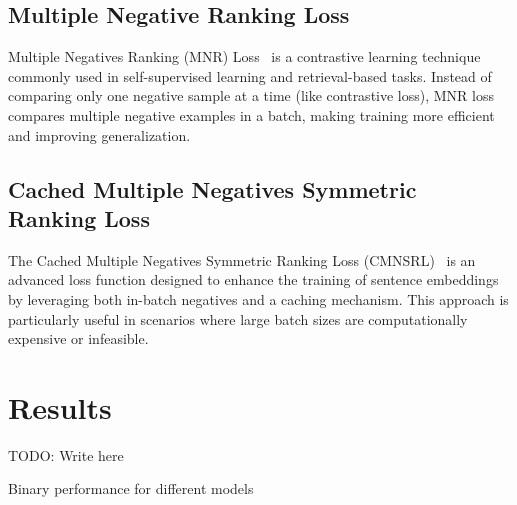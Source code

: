 \documentclass[
	a4paper, %
	10pt, %
	unnumberedsections, %
	twoside, %
]{LTJournalArticle}
\begin{document}
\subsection{Multiple Negative Ranking Loss}
Multiple Negatives Ranking (MNR) Loss~\autocite{mnrl} is a contrastive learning technique commonly used in self-supervised learning and retrieval-based tasks. Instead of comparing only one negative sample at a time (like contrastive loss), MNR loss compares multiple negative examples in a batch, making training more efficient and improving generalization.

\subsection{Cached Multiple Negatives Symmetric Ranking Loss}
The Cached Multiple Negatives Symmetric Ranking Loss (CMNSRL)~\autocite{cmnsrl} is an advanced loss function designed to enhance the training of sentence embeddings by leveraging both in-batch negatives and a caching mechanism. This approach is particularly useful in scenarios where large batch sizes are computationally expensive or infeasible.


\section{Results}

TODO: Write here

\begin{table}[h]
    \centering
    \caption{Binary performance for different models}
    \label{tab:binary_performance}
\end{table}
\end{document}
